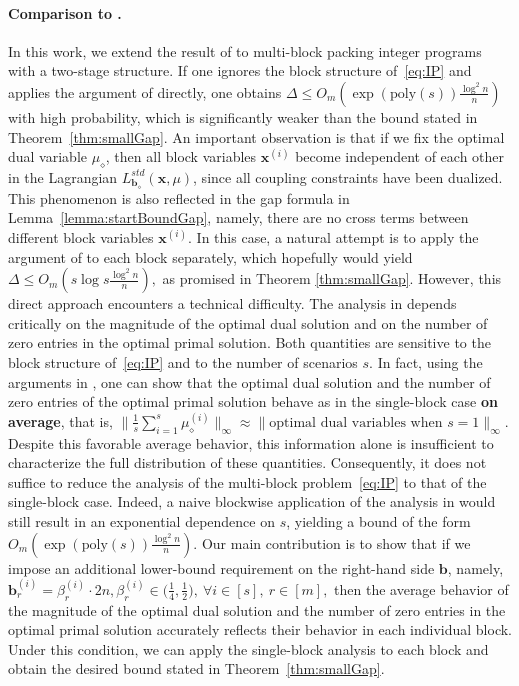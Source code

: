 \documentclass{article}
\newcommand{\xv}[0]{\mathbf{x}}
\newcommand{\bv}[0]{\mathbf{b}}
\newcommand{\normm}[1]{\big\lVert#1\big\rVert}
\begin{document}
\paragraph{Comparison to \cite{dyer1989probabilistic}.} In this work, we extend the result of \cite{dyer1989probabilistic} to
multi-block packing integer programs with a two-stage structure.
If one ignores the block structure of~\eqref{eq:IP} and applies the argument of
\cite{dyer1989probabilistic} directly, one obtains $
\Delta \le O_m\!\left(\exp(\mathrm{poly}(s)) \frac{\log^2 n}{n}\right)$
with high probability, which is significantly weaker than the bound stated in
Theorem~\ref{thm:smallGap}.
An important observation is that if we fix the optimal dual variable
$\mu_{\diamond}$, then all block variables $\xv^{(i)}$ become independent of
each other in the Lagrangian
$L^{std}_{\bv_{\diamond}}(\xv,\mu)$, since all coupling constraints have been
dualized.
This phenomenon is also reflected in the gap formula in
Lemma~\ref{lemma:startBoundGap}, namely, there are no cross terms between
different block variables $\xv^{(i)}$.
In this case, a natural attempt is to apply the argument of
\cite{dyer1989probabilistic} to each block separately, which hopefully would yield $
\Delta \le O_m\!\left( s \log s \frac{\log^2 n}{n}\right),$
as promised in Theorem \ref{thm:smallGap}.
However, this direct approach encounters a technical difficulty.
The analysis in \cite{dyer1989probabilistic,borst2023integrality} depends critically on the magnitude
of the optimal dual solution and on the number of zero entries in the optimal
primal solution.
Both quantities are sensitive to the block structure of~\eqref{eq:IP} and to the
number of scenarios $s$.
In fact, using the arguments in
\cite{dyer1989probabilistic,borst2023integrality}, one can show that the optimal
dual solution and the number of zero entries of the optimal primal solution
behave as in the single-block case \textbf{on average}, that is,
$\normm{\frac{1}{s} \sum_{i=1}^s \mu^{(i)}_{\diamond}}_{\infty}
\approx
\normm{\text{optimal dual variables when } s=1}_{\infty}.$
Despite this favorable average behavior, this information alone is insufficient
to characterize the full distribution of these quantities.
Consequently, it does not suffice to reduce the analysis of the multi-block
problem~\eqref{eq:IP} to that of the single-block case.
Indeed, a naive blockwise application of the analysis in
\cite{dyer1989probabilistic} would still result in an exponential dependence on
$s$, yielding a bound of the form
$O_m\!\left(\exp(\mathrm{poly}(s)) \frac{\log^2 n}{n}\right).$
Our main contribution is to show that if we impose an additional lower-bound
requirement on the right-hand side $\bv$, namely,
$\bv^{(i)}_r = \beta^{(i)}_r \cdot 2n,
\beta^{(i)}_r \in \big(\tfrac{1}{4}, \tfrac{1}{2}\big),
\ \forall i \in [s],\ r \in [m],$
then the average behavior of the magnitude of the optimal dual solution and the
number of zero entries in the optimal primal solution accurately reflects their
behavior in each individual block.
Under this condition, we can apply the single-block analysis to each block and
obtain the desired bound stated in
Theorem~\ref{thm:smallGap}.
\end{document}

